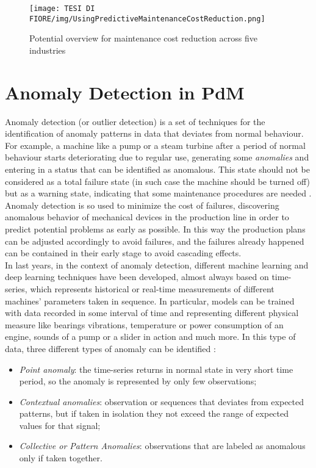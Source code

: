 \begin{figure}[ht]
\texttt{[image: TESI DI FIORE/img/UsingPredictiveMaintenanceCostReduction.png]}
\centering
\caption{Potential overview for maintenance cost reduction across five industries \cite{11PorscheStudy}}
\label{predictive_maintenance_reduction_costs}
\end{figure}


\section{Anomaly Detection in PdM}
Anomaly detection (or outlier detection) is a set of techniques for the identification of anomaly patterns in data that deviates from normal behaviour. For example, a machine like a pump or a steam turbine after a period of normal behaviour starts deteriorating due to regular use, generating some \textit{anomalies} and entering in a status that can be identified as anomalous. This state should not be considered as a total failure state (in such case the machine should be turned off) but as a warning state, indicating that some maintenance procedures are needed \cite{5AnomalyDetectionSurvey}. Anomaly detection is so used to minimize the cost of failures, discovering anomalous behavior of mechanical devices in the production line in order to predict potential problems as early as possible. In this way the production plans can be adjusted accordingly to avoid failures, and the failures already happened can be contained in their early stage to avoid cascading effects.\\
In last years, in the context of anomaly detection, different machine learning and deep learning techniques have been developed, almost always based on time-series, which represents historical or real-time measurements of different machines' parameters taken in sequence. In particular, models can be trained with data recorded in some interval of time and representing different physical measure like bearings vibrations, temperature or power consumption of an engine, sounds of a pump or a slider in action and much more. In this type of data, three different types of anomaly can be identified \cite{6AnomalyIoTTimeSeries}: 
\begin{itemize}
\item{\textit{Point anomaly}: the time-series returns in normal state in very short time period, so the anomaly is represented by only few observations;}
\item{\textit{Contextual anomalies}: observation or sequences that deviates from expected patterns, but if taken in isolation they not exceed the range of expected values for that signal;}
\item{\textit{Collective or Pattern Anomalies}: observations that are labeled as anomalous only if taken together.}
\end{itemize}
